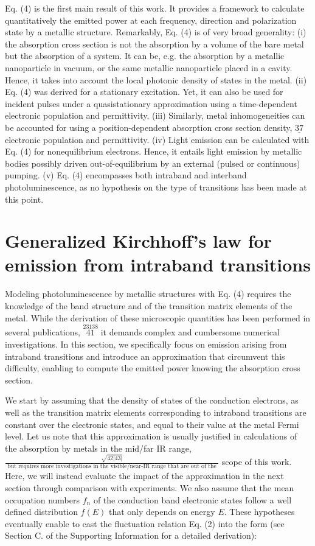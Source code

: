 \documentclass[10pt]{article}
\begin{document}
Eq. (4) is the first main result of this work. It provides a framework to calculate quantitatively the emitted power at each frequency, direction and polarization state by a metallic structure. Remarkably, Eq. (4) is of very broad generality: (i) the absorption cross section is not the absorption by a volume of the bare metal but the absorption of a system. It can be, e.g. the absorption by a metallic nanoparticle in vacuum, or the same metallic nanoparticle placed in a cavity. Hence, it takes into account the local photonic density of states in the metal. (ii) Eq. (4) was derived for a stationary excitation. Yet, it can also be used for incident pulses under a quasistationary approximation using a time-dependent electronic population and permittivity. (iii) Similarly, metal inhomogeneities can be accounted for using a position-dependent absorption cross section density, $\underline{37}$ electronic population and permittivity. (iv) Light emission can be calculated with Eq. (4) for nonequilibrium electrons. Hence, it entails light emission by metallic bodies possibly driven out-of-equilibrium by an external (pulsed or continuous) pumping. (v) Eq. (4) encompasses both intraband and interband photoluminescence, as no hypothesis on the type of transitions has been made at this point.

\section*{Generalized Kirchhoff's law for emission from intraband transitions}
Modeling photoluminescence by metallic structures with Eq. (4) requires the knowledge of the band structure and of the transition matrix elements of the metal. While the derivation of these microscopic quantities has been performed in several publications, $\stackrel{23138}{41}$ it demands complex and cumbersome numerical investigations. In this section, we specifically focus on emission arising from intraband transitions and introduce an approximation that circumvent this difficulty, enabling to compute the emitted power knowing the absorption cross section.

We start by assuming that the density of states of the conduction electrons, as well as the transition matrix elements corresponding to intraband transitions are constant over the electronic states, and equal to their value at the metal Fermi level. Let us note that this approximation is usually justified in calculations of the absorption by metals in the mid/far IR range, $\frac{\sqrt{42|43|}}{\text { but requires more investigations in the visible/near-IR range that are out of the }}$ scope of this work. Here, we will instead evaluate the impact of the approximation in the next section through comparison with experiments. We also assume that the mean occupation numbers $f_{n}$ of the conduction band electronic states follow a well defined distribution $f(E)$ that only depends on energy $E$. These hypotheses eventually enable to cast the fluctuation relation Eq. (2) into the form (see Section C. of the Supporting Information for a detailed derivation):
\end{document}
